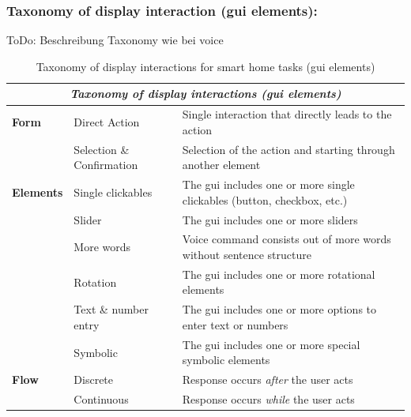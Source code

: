 \documentclass[sigchi]{acmart}
\begin{document}
	\subsubsection{Taxonomy of display interaction (\ac{gui} elements):}
	ToDo: Beschreibung Taxonomy wie bei voice
	\begin{table}[t]
		\begin{center}
			\caption{Taxonomy of display interactions for smart home tasks (\ac{gui} elements)}
			\label{tab:taxDisplayGUI}
			\begin{footnotesize}				
				\begin{tabular}{p{0.2\columnwidth} p{} p{}} \toprule
					\multicolumn{3}{c}{\textit{Taxonomy of display interactions (\ac{gui} elements)}} \\ \midrule
					\textbf{Form}		& Direct Action				& Single interaction that directly leads to the action \\
										& Selection \& Confirmation	& Selection of the action and starting through another element\\ \midrule
					\textbf{Elements} 	& Single clickables			& The \ac{gui} includes one or more single clickables 
																	  (button, checkbox, etc.) \\
										& Slider					& The \ac{gui} includes one or more sliders \\
										& More words				& Voice command consists out of more words without sentence structure \\
										& Rotation					& The \ac{gui} includes one or more rotational elements \\ 
										& Text \& number entry		& The \ac{gui} includes one or more options to enter text or numbers \\
										& Symbolic					& The \ac{gui} includes one or more special symbolic elements\\ \midrule
					\textbf{Flow}		& Discrete		& Response occurs \textit{after} the user acts \\ 
										& Continuous 	& Response occurs \textit{while} the user acts  \\ \bottomrule
				\end{tabular}
			\end{footnotesize}	
		\end{center}
	\end{table}	
\end{document}
